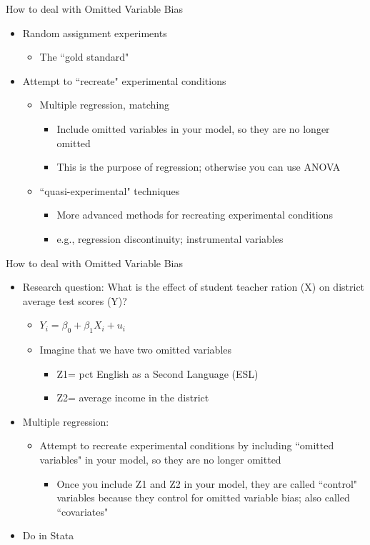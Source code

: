 \begin{frame}{How to deal with Omitted Variable Bias}
	\begin{itemize}
	\item Random assignment experiments
		\begin{itemize}
		\item The ``gold standard"
		\end{itemize}
	\item Attempt to ``recreate" experimental conditions
		\begin{itemize}
		\item Multiple regression, matching
			\begin{itemize}
			\item Include omitted variables in your model, so they are no longer omitted
			\item This is the purpose of regression; otherwise you can use ANOVA
			\end{itemize}
		\item ``quasi-experimental" techniques
			\begin{itemize}
			\item More advanced methods for recreating experimental conditions 
			\item e.g., regression discontinuity; instrumental variables
			\end{itemize}
		\end{itemize}
	\end{itemize}
\end{frame}


\begin{frame}{How to deal with Omitted Variable Bias}
	\begin{itemize}
	\item Research question: What is the effect of student teacher ration (X) on district average test scores (Y)?
		\begin{itemize}
		\item $Y_{i} = \beta_{0} + \beta_{1}X_{i} + u_{i}$
		\item Imagine that we have two omitted variables 
			\begin{itemize}
			\item Z1= pct English as a Second Language (ESL)
			\item Z2= average income in the district
			\end{itemize}
		\end{itemize}
	\item Multiple regression:
		\begin{itemize}
		\item Attempt to recreate experimental conditions by including ``omitted variables" in your model, so they are no longer omitted
			\begin{itemize}
			\item Once you include Z1 and Z2 in your model, they are called ``control" variables because they control for omitted variable bias; also called ``covariates"
			\end{itemize}
		\end{itemize}
	\item Do in Stata
	\end{itemize}
\end{frame}

